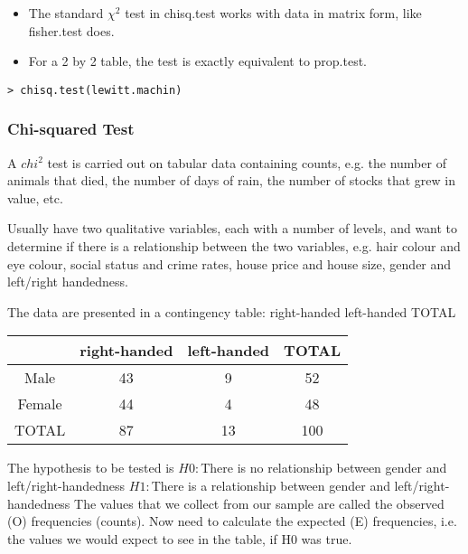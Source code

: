 \documentclass[a4paper,12pt]{article}
\begin{document}
\begin{itemize}
\begin{itemize}
\item The standard $\chi^{2}$ test  in chisq.test works with data in matrix form, like fisher.test does.
\item For a 2 by 2 table, the test is exactly equivalent to prop.test.
\end{itemize}


\footnotesize \begin{verbatim}
> chisq.test(lewitt.machin)
\end{verbatim}\normalsize



\subsubsection{Chi-squared Test}

A $chi^2$ test is carried out on tabular data containing counts, e.g. the
number of animals that died, the number of days of rain, the
number of stocks that grew in value, etc.

Usually have two qualitative variables, each with a number of
levels, and want to determine if there is a relationship between the
two variables, e.g. hair colour and eye colour, social status and
crime rates, house price and house size, gender and left/right
handedness.

The data are presented in a contingency table:
right-handed left-handed TOTAL

\begin{tabular}{|c|c|c|c|}
  \hline
  & right-handed &left-handed & TOTAL\\\hline
  Male & 43 & 9 & 52 \\
  Female & 44 & 4 & 48 \\
  TOTAL & 87 & 13 & 100 \\
  \hline
\end{tabular}


The hypothesis to be tested is
$H0 :$There is no relationship between gender and left/right-handedness
$H1 :$There is a relationship between gender and left/right-handedness
 The values that we collect from our sample are called the observed
(O) frequencies (counts). Now need to calculate the expected (E)
frequencies, i.e. the values we would expect to see in the table, if
H0 was true.







\end{itemize}
\end{document}
